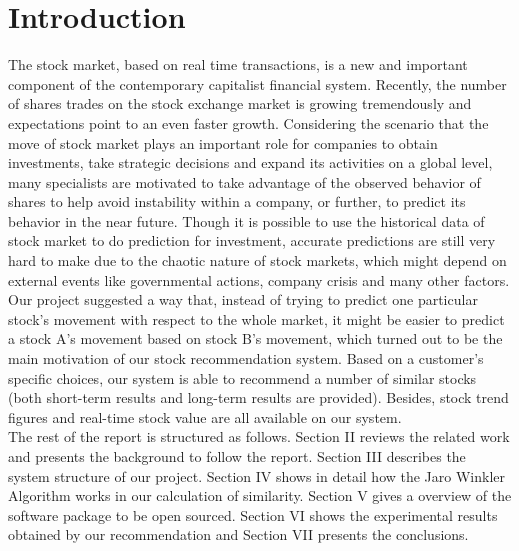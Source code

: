 \documentclass[10pt, conference, compsocconf]{IEEEtran}
\begin{document}
\section{Introduction}

The stock market, based on real time transactions, is a new and important component of the contemporary capitalist financial system\cite{Similarity}. Recently, the number of shares trades on the stock exchange market is growing tremendously and expectations point to an even faster growth\cite{From}. Considering the scenario that the move of stock market plays an important role for companies to obtain investments, take strategic decisions and expand its activities on a global level, many specialists are motivated to take advantage of the observed behavior of shares to help avoid instability within a company, or further, to predict its behavior in the near future. Though it is possible to use the historical data of stock market to do prediction for investment\cite{Forecasting}, accurate predictions are still very hard to make due to the chaotic nature of stock markets, which might depend on external events like governmental actions, company crisis and many other factors.\\

Our project suggested a way that, instead of trying to predict one particular stock\rq s movement with respect to the whole market, it might be easier to predict a stock A\rq s movement based on stock B\rq s movement, which turned out to be the main motivation of our stock recommendation system\cite{Identifying}. Based on a customer\rq s specific choices, our system is able to recommend a number of similar stocks (both short-term results and long-term results are provided). Besides, stock trend figures and real-time stock value are all available on our system. \\

The rest of the report is structured as follows. Section II reviews the related work and presents the background to follow the report. Section III describes the system structure of our project. Section IV shows in detail how the Jaro Winkler Algorithm works in our calculation of similarity. Section V gives a overview of the software package to be open sourced. Section VI shows the experimental results obtained by our recommendation and Section VII presents the conclusions.


\end{document}
